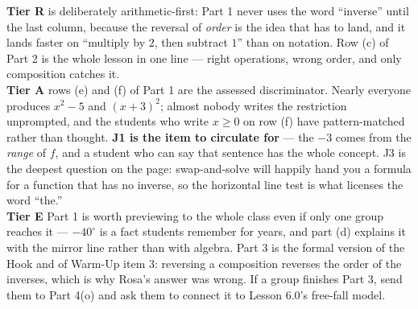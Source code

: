 \documentclass[10pt]{article}
\begin{document}
\begin{teachernote}
\small \textbf{Tier R} is deliberately arithmetic-first: Part 1 never uses the word ``inverse'' until
the last column, because the reversal of \emph{order} is the idea that has to land, and it lands
faster on ``multiply by $2$, then subtract $1$'' than on notation. Row (c) of Part 2 is the whole
lesson in one line --- right operations, wrong order, and only composition catches it.
\\[3pt]
\textbf{Tier A} rows (e) and (f) of Part 1 are the assessed discriminator. Nearly everyone produces
$x^{2}-5$ and $(x+3)^{2}$; almost nobody writes the restriction unprompted, and the students who
write $x\ge0$ on row (f) have pattern-matched rather than thought. \textbf{J1 is the item to
circulate for} --- the $-3$ comes from the \emph{range} of $f$, and a student who can say that
sentence has the whole concept. J3 is the deepest question on the page: swap-and-solve will happily
hand you a formula for a function that has no inverse, so the horizontal line test is what licenses
the word ``the.''
\\[3pt]
\textbf{Tier E} Part 1 is worth previewing to the whole class even if only one group reaches it ---
$-40^\circ$ is a fact students remember for years, and part (d) explains it with the mirror line
rather than with algebra. Part 3 is the formal version of the Hook and of Warm-Up item 3: reversing
a composition reverses the order of the inverses, which is why Rosa's answer was wrong. If a group
finishes Part 3, send them to Part 4(o) and ask them to connect it to Lesson 6.0's free-fall model.
\end{teachernote}
\end{document}
